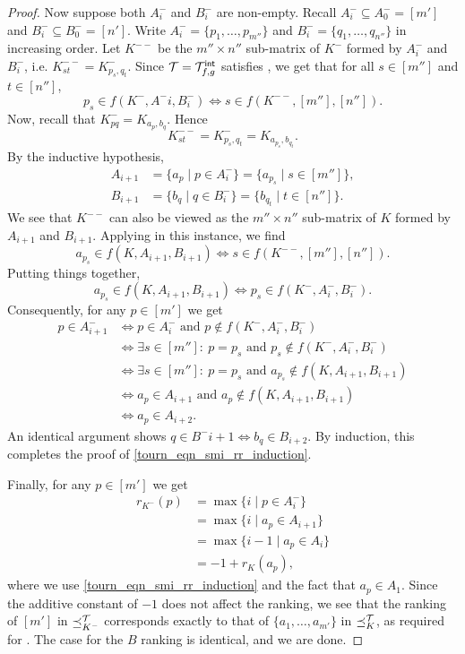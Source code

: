 \begin{proof}
    Now suppose both $A^-_i$ and $B^-_i$ are non-empty. Recall $A^-_i \subseteq
    A^-_0 = [m']$ and $B^-_i \subseteq B^-_0 = [n']$. Write $A^-_i = \{p_1,
    \ldots, p_{m''}\}$ and $B^-_i = \{q_1, \ldots, q_{n''}\}$ in increasing
    order. Let $K^{--}$ be the $m'' \times n''$ sub-matrix of $K^-$ formed by
    $A^-_i$ and $B^-_i$, i.e. $K^{--}_{st} = K^-_{p_s, q_t}$. Since $\mathcal{T} =
    {\mathcal{T}_{f, g}^\mathsf{int}}$ satisfies \smi{}, we get that for all $s \in [m'']$
    and $t \in [n'']$,
    \[
        p_s \in f(K^-, A^-i, B^-_i) \iff s \in f(K^{--}, [m''], [n'']).
    \]
    Now, recall that $K^-_{pq} = K_{a_p, b_q}$. Hence
    \[
        K^{--}_{st} = K^-_{p_s, q_t} = K_{a_{p_s}, b_{q_t}}.
    \]
    By the inductive hypothesis,
    \begin{align*}
        A_{i + 1} &= \{a_p \mid p \in A^-_i\} = \{a_{p_s} \mid s \in [m'']\}, \\
        B_{i + 1} &= \{b_q \mid q \in B^-_i\} = \{b_{q_t} \mid t \in [n'']\}.
    \end{align*}
    We see that $K^{--}$ can also be viewed as the $m'' \times n''$ sub-matrix
    of $K$ formed by $A_{i + 1}$ and $B_{i + 1}$. Applying \smi{} in
    this instance, we find
    \[
        a_{p_s} \in f(K, A_{i + 1}, B_{i + 1})
            \iff s \in f(K^{--}, [m''], [n'']).
    \]
    Putting things together,
    \[
        a_{p_s} \in f(K, A_{i + 1}, B_{i + 1})
            \iff p_s \in f(K^-, A^-_i, B^-_i).
    \]
    Consequently, for any $p \in [m']$ we get
    \begin{align*}
        p \in A^-_{i + 1}
        &\iff p \in A^-_i \text{ and } p \notin f(K^-, A^-_i, B^-_i) \\
        &\iff \exists s \in [m'']:\ p = p_s \text{ and } p_s \notin f(K^-, A^-_i, B^-_i) \\
        &\iff \exists s \in [m'']:\ p = p_s \text{ and } a_{p_s} \notin f(K, A_{i + 1}, B_{i + 1}) \\
        &\iff a_p \in A_{i + 1} \text{ and } a_p \notin f(K, A_{i + 1}, B_{i + 1}) \\
        &\iff a_p \in A_{i + 2}.
    \end{align*}
    An identical argument shows $q \in B^-{i + 1} \iff b_q \in B_{i + 2}$. By
    induction, this
    completes the proof of \cref{tourn_eqn_smi_rr_induction}.

    Finally, for any $p \in [m']$ we get
    \begin{align*}
        r_{K^-}(p)
        &= \max\{i \mid p \in A^-_i\} \\
        &= \max\{i \mid a_p \in A_{i + 1}\} \\
        &= \max\{i - 1\mid a_p \in A_i\} \\
        &= -1 + r_K(a_p),
    \end{align*}
    where we use \cref{tourn_eqn_smi_rr_induction} and the fact that $a_p
    \in A_1$. Since the additive constant of $-1$ does not affect the ranking,
    we see that the ranking of $[m']$ in $\preceq_{K^-}^{\mathcal{T}}$ corresponds exactly
    to that of $\{a_1, \ldots, a_{m'}\}$ in $\preceq_K^{\mathcal{T}}$, as required for
    \rankremoval{}. The case for the $B$ ranking is identical, and we
    are done.


\end{proof}
